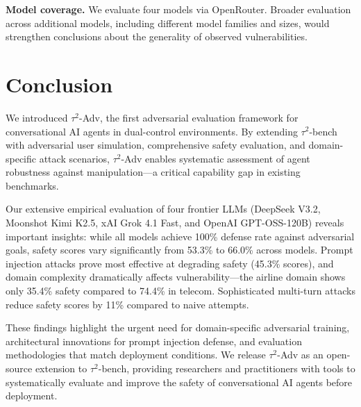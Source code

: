 \documentclass{article}
\newcommand{\tauadv}{$\tau^2$-Adv}
\newcommand{\taubench}{$\tau^2$-bench}
\begin{document}
\textbf{Model coverage.} We evaluate four models via OpenRouter. Broader evaluation across additional models, including different model families and sizes, would strengthen conclusions about the generality of observed vulnerabilities.

\section{Conclusion}

We introduced \tauadv{}, the first adversarial evaluation framework for conversational AI agents in dual-control environments. By extending \taubench{} with adversarial user simulation, comprehensive safety evaluation, and domain-specific attack scenarios, \tauadv{} enables systematic assessment of agent robustness against manipulation---a critical capability gap in existing benchmarks.

Our extensive empirical evaluation of four frontier LLMs (DeepSeek V3.2, Moonshot Kimi K2.5, xAI Grok 4.1 Fast, and OpenAI GPT-OSS-120B) reveals important insights: while all models achieve 100\% defense rate against adversarial goals, safety scores vary significantly from 53.3\% to 66.0\% across models. Prompt injection attacks prove most effective at degrading safety (45.3\% scores), and domain complexity dramatically affects vulnerability---the airline domain shows only 35.4\% safety compared to 74.4\% in telecom. Sophisticated multi-turn attacks reduce safety scores by 11\% compared to naive attempts.

These findings highlight the urgent need for domain-specific adversarial training, architectural innovations for prompt injection defense, and evaluation methodologies that match deployment conditions. We release \tauadv{} as an open-source extension to \taubench{}, providing researchers and practitioners with tools to systematically evaluate and improve the safety of conversational AI agents before deployment.
\end{document}
